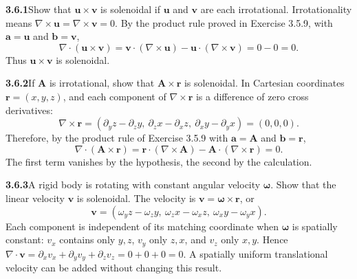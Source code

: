 \par\bigskip
\noindent\textbf{3.6.1}\quad Show that $\mathbf{u}\times\mathbf{v}$ is
solenoidal if $\mathbf{u}$ and $\mathbf{v}$ are each irrotational.
\solution
Irrotationality means $\nabla\times\mathbf u=\nabla\times\mathbf v=0$.
By the product rule proved in Exercise 3.5.9, with $\mathbf a=\mathbf u$
and $\mathbf b=\mathbf v$,
\[
\nabla\cdot(\mathbf u\times\mathbf v)
=\mathbf v\cdot(\nabla\times\mathbf u)
-\mathbf u\cdot(\nabla\times\mathbf v)=0-0=0.
\]
Thus $\mathbf u\times\mathbf v$ is solenoidal.

\par\bigskip
\noindent\textbf{3.6.2}\quad If $\mathbf{A}$ is irrotational, show that
$\mathbf{A}\times\mathbf{r}$ is solenoidal.
\solution
In Cartesian coordinates $\mathbf r=(x,y,z)$, and each component of
$\nabla\times\mathbf r$ is a difference of zero cross derivatives:
\[
\nabla\times\mathbf r=(\partial_yz-\partial_zy,\ \partial_zx-\partial_xz,\
\partial_xy-\partial_yx)=(0,0,0).
\]
Therefore, by the product rule of Exercise 3.5.9 with
$\mathbf a=\mathbf A$ and $\mathbf b=\mathbf r$,
\[
\nabla\cdot(\mathbf A\times\mathbf r)
=\mathbf r\cdot(\nabla\times\mathbf A)
-\mathbf A\cdot(\nabla\times\mathbf r)=0.
\]
The first term vanishes by the hypothesis, the second by the calculation.

\par\bigskip
\noindent\textbf{3.6.3}\quad A rigid body is rotating with constant angular
velocity $\boldsymbol{\omega}$. Show that the linear velocity $\mathbf{v}$ is
solenoidal.
\solution
The velocity is $\mathbf v=\boldsymbol\omega\times\mathbf r$, or
\[
\mathbf v=(\omega_yz-\omega_zy,\ \omega_zx-\omega_xz,\
\omega_xy-\omega_yx).
\]
Each component is independent of its matching coordinate when
$\boldsymbol\omega$ is spatially constant: $v_x$ contains only $y,z$,
$v_y$ only $z,x$, and $v_z$ only $x,y$. Hence
$\nabla\cdot\mathbf v=\partial_xv_x+\partial_yv_y+\partial_zv_z
=0+0+0=0$.
A spatially uniform translational velocity can be added without changing
this result.

